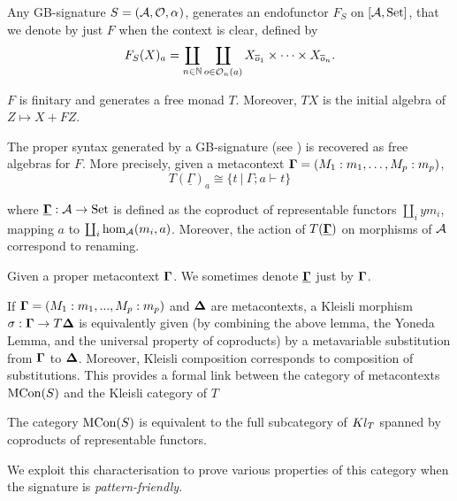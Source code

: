 Any GB-signature $S=({\cal A},\indexedO,\ntharvecfunct)$, generates
an endofunctor $F_{S}$ on $[{\cal A},\Set]$, that we denote by just
$F$ when the context is clear, defined by
\[
F_{S}(X)_{a}=\coprod_{n\in\mathbb{N}}\coprod_{o\in\Oop na}X_{\nthar o1}\times\dots\times X_{\nthar on}.
\]
%
\begin{lemma}
\label{lem:F-finitary}$F$ is finitary and generates a free monad
$T$. Moreover, $TX$ is the initial algebra of $Z\mapsto X+FZ$.

\label{lem:free-alg-syntax}The proper syntax generated by a GB-signature
(see ) is recovered as free algebras for $F$.
More precisely, given a metacontext $\dotmcontext{\Gamma}=(M_{1}:m_{1},\dots,M_{p}:m_{p})$,
\[
T(\underline{\Gamma})_{a}\cong\{t\ |\ \Gamma;a\vdash t\}
\]

where $\underline{\dotmcontext{\Gamma}}:{\cal A}\rightarrow\Set$
is defined as the coproduct of representable functors $\coprod_{i}ym_{i}$,
mapping $a$ to $\coprod_{i}\hom_{{\cal A}}(m_{i},a)$. Moreover,
the action of $T(\underline{\dotmcontext{\Gamma}})$ on morphisms
of ${\cal A}$ correspond to renaming.

\end{lemma}
\begin{notation}
Given a proper metacontext $\dotmcontext{\Gamma}$. We sometimes denote
$\underline{\dotmcontext{\Gamma}}$ just by $\dotmcontext{\Gamma}$.
\end{notation}
If $\dotmcontext{\Gamma}=(M_{1}:m_{1},...,M_{p}:m_{p})$ and $\dotmcontext{\Delta}$
are metacontexts, a Kleisli morphism $\sigma:\dotmcontext{\Gamma}\rightarrow T\dotmcontext{\Delta}$
is equivalently given (by combining the above lemma, the Yoneda Lemma,
and the universal property of coproducts) by a metavariable substitution
from $\dotmcontext{\Gamma}$ to $\dotmcontext{\Delta}$. Moreover,
Kleisli composition corresponds to composition of substitutions. This
provides a formal link between the category of metacontexts $\Th S$
and the Kleisli category of $T$
\begin{lemma}
\label{lem:mcon-kleisli}The category $\Th S$ is equivalent to the
full subcategory of $\Kl T$ spanned by coproducts of representable
functors.
\end{lemma}
%
We exploit this characterisation to prove various properties of this
category when the signature is \emph{pattern-friendly}.

